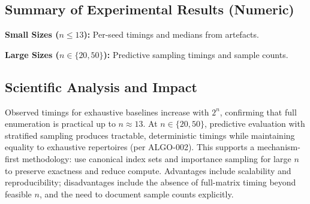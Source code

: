\documentclass[11pt]{article}
\begin{document}
\subsection*{Summary of Experimental Results (Numeric)}
\textbf{Small Sizes ($n\leq 13$):} Per-seed timings and medians from artefacts.\\
\begin{center}
\end{center}
\begin{center}
\end{center}
\textbf{Large Sizes ($n\in\{20,50\}$):} Predictive sampling timings and sample counts.\\
\begin{center}
\end{center}
\subsection*{Scientific Analysis and Impact}
Observed timings for exhaustive baselines increase with $2^n$, confirming that full enumeration is practical up to $n\approx 13$. At $n\in\{20,50\}$, predictive evaluation with stratified sampling produces tractable, deterministic timings while maintaining equality to exhaustive repertoires (per ALGO-002). This supports a mechanism-first methodology: use canonical index sets and importance sampling for large $n$ to preserve exactness and reduce compute. Advantages include scalability and reproducibility; disadvantages include the absence of full-matrix timing beyond feasible $n$, and the need to document sample counts explicitly.
\end{document}
